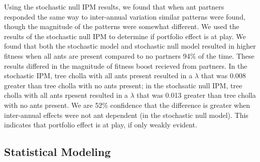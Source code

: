 \documentclass[11pt]{article}
\begin{document}
Using the stochastic null IPM results, we found that when ant partners responded the same way to inter-annual variation similar patterns were found, though the magnitude of the patterns were somewhat different. 
We used the results of the stochastic null IPM to determine if portfolio effect is at play. 
We found that both the stochastic model and stochastic null model resulted in higher fitness when all ants are present compared to no partners 94\% of the time. 
These results differed in the magnitude of fitness boost recieved from partners.
In the stochastic IPM, tree cholla with all ants present resulted in a $\lambda$ that was 0.008 greater than tree cholla with no ants present; in the stochsatic null IPM, tree cholla with all ants rpesent resulted in a $\lambda$ that was 0.013 greater than tree cholla with no ants present. 
We are 52\% confidence that the difference is greater when inter-annual effects were not ant dependent (in the stochastic null model).
This indicates that portfolio effect is at play, if only weakly evident. 

\subsection*{Statistical Modeling}
\end{document}
